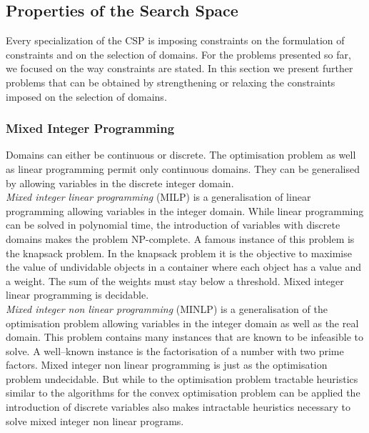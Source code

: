 \subsection{Properties of the Search Space}
\label{sec:MathSearchSpaceProperties}
Every specialization of the CSP is imposing constraints on the formulation of constraints and on the selection of domains. For the problems presented so far, we focused on the way constraints are stated. In this section we present further problems that can be obtained by strengthening or relaxing the constraints imposed on the selection of domains.
\subsubsection{Mixed Integer Programming}
Domains can either be continuous or discrete. The optimisation problem as well as linear programming permit only continuous domains. They can be generalised by allowing variables in the discrete integer domain.\\
\emph{Mixed integer linear programming} (MILP) is a generalisation of linear programming allowing variables in the integer domain. While linear programming can be solved in polynomial time, the introduction of variables with discrete domains makes the problem NP-complete. A famous instance of this problem is the knapsack problem. In the knapsack problem it is the objective to maximise the value of undividable objects in a container where each object has a value and a weight. The sum of the weights must stay below a threshold. Mixed integer linear programming is decidable.\\
\emph{Mixed integer non linear programming} (MINLP) is a generalisation of the optimisation problem allowing variables in the integer domain as well as the real domain. This problem contains many instances that are known to be infeasible to solve. A well--known instance is the factorisation of a number with two prime factors. Mixed integer non linear programming is just as the optimisation problem undecidable. But while to the optimisation problem tractable heuristics similar to the algorithms for the convex optimisation problem can be applied the introduction of discrete variables also makes intractable heuristics necessary to solve mixed integer non linear programs.

